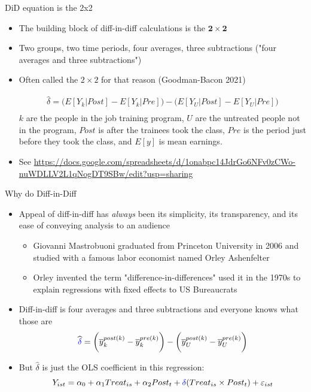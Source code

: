 \documentclass{beamer}
\begin{document}
\begin{frame}{DiD equation is the 2x2}

\begin{itemize}
\item The building block of diff-in-diff calculations is the $\mathbf{2 \times 2}$ 
\item Two groups, two time periods, four averages, three subtractions ("four averages and three subtractions")
\item Often called the $2 \times 2$ for that reason (Goodman-Bacon 2021)

\begin{eqnarray*}
\widehat{\delta} = \bigg ( E[Y_k|Post] - E[Y_k|Pre] \bigg ) - \bigg ( E[Y_U | Post ] - E[ Y_U | Pre] \bigg) \\
\end{eqnarray*}$k$ are the people in the job training program, $U$ are the untreated people not in the program, $Post$ is after the trainees took the class, $Pre$ is the period just before they took the class, and $E[y]$ is mean earnings.
\item See \url{https://docs.google.com/spreadsheets/d/1onabpc14JdrGo6NFv0zCWo-nuWDLLV2L1qNogDT9SBw/edit?usp=sharing}
\end{itemize}

\end{frame}



\begin{frame}{Why do Diff-in-Diff}

\begin{itemize}
\item Appeal of diff-in-diff has \emph{always} been its simplicity, its transparency, and its ease of conveying analysis to an audience
	\begin{itemize}
	\item Giovanni Mastrobuoni graduated from Princeton University in 2006 and studied with a famous labor economist named Orley Ashenfelter
	\item Orley invented the term "difference-in-differences" used it in the 1970s to explain regressions with fixed effects to US Bureaucrats
	\end{itemize}
\item Diff-in-diff is four averages and three subtractions and everyone knows what those are
$$\widehat{\textcolor{blue}{\delta}} = \bigg ( \overline{y}_k^{post(k)} - \overline{y}_k^{pre(k)} \bigg ) - \bigg ( \overline{y}_U^{post(k)} - \overline{y}_U^{pre(k)} \bigg ) $$
\item But $\widehat{\delta}$ is just the OLS coefficient in this regression:
$$Y_{ist} = \alpha_0 + \alpha_1 Treat_{is} + \alpha_2 Post_{t} + \textcolor{blue}{\delta} (Treat_{is} \times Post_t) + \varepsilon_{ist} $$
\end{itemize}

\end{frame}
\end{document}
